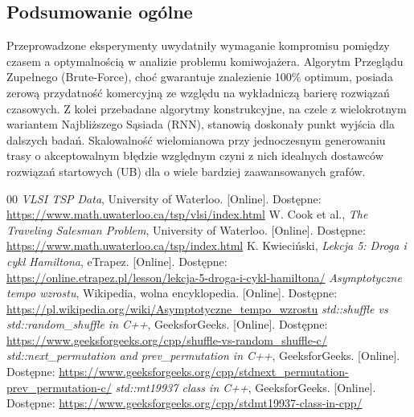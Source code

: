 \documentclass[conference]{IEEEtran}
\begin{document}
        \subsection{Podsumowanie ogólne}
            Przeprowadzone eksperymenty uwydatniły wymaganie kompromisu pomiędzy czasem a optymalnością w analizie problemu komiwojażera. Algorytm Przeglądu Zupełnego (Brute-Force), choć gwarantuje znalezienie 100\% optimum, posiada zerową przydatność komercyjną ze względu na wykładniczą barierę rozwiązań czasowych. 
            Z kolei przebadane algorytmy konstrukcyjne, na czele z wielokrotnym wariantem Najbliższego Sąsiada (RNN), stanowią doskonały punkt wyjścia dla dalszych badań. Skalowalność wielomianowa przy jednoczesnym generowaniu trasy o akceptowalnym błędzie względnym czyni z nich idealnych dostawców rozwiązań startowych (UB) dla o wiele bardziej zaawansowanych grafów.


        \begin{thebibliography}{00}
             \textit{VLSI TSP Data}, University of Waterloo. [Online]. Dostępne: \url{https://www.math.uwaterloo.ca/tsp/vlsi/index.html}
             W. Cook et al., \textit{The Traveling Salesman Problem}, University of Waterloo. [Online]. Dostępne: \url{https://www.math.uwaterloo.ca/tsp/index.html}
             K. Kwieciński, \textit{Lekcja 5: Droga i cykl Hamiltona}, eTrapez. [Online]. Dostępne: \url{https://online.etrapez.pl/lesson/lekcja-5-droga-i-cykl-hamiltona/}
             \textit{Asymptotyczne tempo wzrostu}, Wikipedia, wolna encyklopedia. [Online]. Dostępne: \url{https://pl.wikipedia.org/wiki/Asymptotyczne_tempo_wzrostu}
             \textit{std::shuffle vs std::random\_shuffle in C++}, GeeksforGeeks. [Online]. Dostępne: \url{https://www.geeksforgeeks.org/cpp/shuffle-vs-random_shuffle-c/}
             \textit{std::next\_permutation and prev\_permutation in C++}, GeeksforGeeks. [Online]. Dostępne: \url{https://www.geeksforgeeks.org/cpp/stdnext_permutation-prev_permutation-c/}
             \textit{std::mt19937 class in C++}, GeeksforGeeks. [Online]. Dostępne: \url{https://www.geeksforgeeks.org/cpp/stdmt19937-class-in-cpp/}
        \end{thebibliography}
\end{document}
